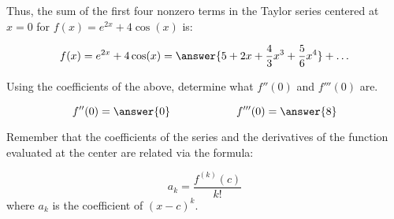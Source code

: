 \documentclass{ximera}
\begin{document}
\begin{exercise}
\begin{exercise}
Thus, the sum of the first four nonzero terms in the Taylor series centered at $x=0$ for  $f(x) = e^{2x} + 4\cos(x)$ is:

\[
f(x) = e^{2x} + 4\cos(x) = \answer{5+2x+\frac{4}{3}x^3+\frac{5}{6}x^4} + \ldots 
\]

\begin{exercise}
Using the coefficients of the above, determine what $f''(0)$ and $f'''(0)$ are.

\[
f''(0) = \answer{0} \qquad \qquad \qquad f'''(0) = \answer{8}
\]

\begin{hint}
Remember that the coefficients of the series and the derivatives of the function evaluated at the center are related via the formula:

\[
a_k = \frac{f^{(k)}(c)}{k!}
\]
where $a_k$ is the coefficient of $(x-c)^k$.
\end{hint}

\end{exercise}
\end{exercise}
\end{exercise}
\end{document}

